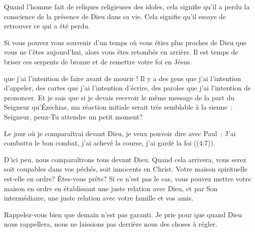 Quand l'homme fait de reliques religieuses des idoles,
 cela signifie qu'il a perdu la conscience de la présence de Dieu dans sa vie.
 Cela signifie qu'il essaye de retrouver ce qui a été perdu. 


Si vous pouvez vous souvenir d'un temps où vous étiez plus proches de Dieu
 que vous ne l'êtes aujourd'hui, alors vous êtes retombés en arrière.
 Il est temps de briser ces serpents de bronze et de remettre votre foi en Jésus. 

\dvrule






 que j'ai l'intention de faire
 avant de mourir ! Il y a des gens que j'ai l'intention d'appeler,
 des cartes que j'ai l'intention d'écrire, des paroles que j'ai l'intention
 de prononcer. Et je sais que si je devais recevoir le même message
 de la part du Seigneur qu'Ézéchias, ma réaction initiale serait très semblable
 à la sienne~: \og Seigneur, peux-Tu attendre un petit moment? \fg{}


Le jour où je comparaîtrai devant Dieu, je veux pouvoir dire avec Paul~:
 \og J'ai combattu le bon combat, j'ai achevé la course,
 j'ai gardé la foi \fg{} ((4:7)). 

D'ici peu, nous comparaîtrons tous devant Dieu. Quand cela arrivera,
 vous serez soit coupables dans vos péchés, soit innocents en Christ.
 Votre maison spirituelle est-elle en ordre? Êtes-vous prêts?
 Si ce n'est pas le cas, vous pouvez mettre votre maison en ordre
 en établissant une juste relation avec Dieu, et par Son intermédiaire,
 une juste relation avec votre famille et vos amis. 

Rappelez-vous bien que demain n'est pas garanti. Je prie pour que quand Dieu
 nous rappellera, nous ne laissions pas derrière nous des choses à régler. 

\dvrule





